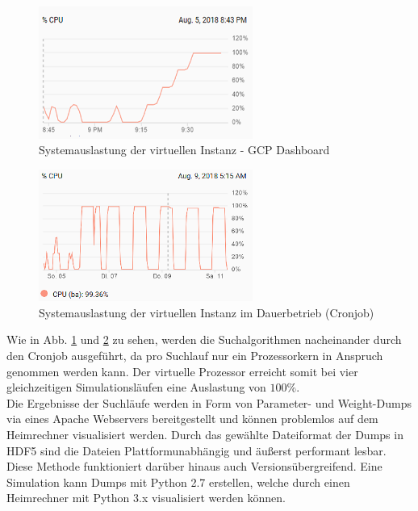 		\begin{minipage}[c]{0.5\textwidth}
			\begin{figure}[H] %
				\centering
				\includegraphics[width=7cm]{figures/chap_implement/GCP.png}
				\caption{Systemauslastung der virtuellen Instanz - GCP Dashboard}
				\label{fig:gcp_1}
			\end{figure}
		\end{minipage}
		\begin{minipage}[c]{0.5\textwidth}
			\begin{figure}[H] %
				\centering
				\includegraphics[width=7cm]{figures/chap_implement/GCP_2.png}
				\caption{Systemauslastung der virtuellen Instanz im Dauerbetrieb (Cronjob)}
				\label{fig:gcp_2}
			\end{figure}
		\end{minipage}\vspace{0.5cm}
		Wie in Abb. \ref{fig:gcp_1} und \ref{fig:gcp_2} zu sehen, werden die Suchalgorithmen nacheinander durch den Cronjob ausgeführt, da pro Suchlauf nur ein Prozessorkern in Anspruch genommen werden kann. Der virtuelle Prozessor erreicht somit bei vier gleichzeitigen Simulationsläufen eine Auslastung von $100\%$.\\
		Die Ergebnisse der Suchläufe werden in Form von Parameter- und Weight-Dumps via eines Apache Webservers bereitgestellt und können problemlos auf dem Heimrechner visualisiert werden. Durch das gewählte Dateiformat der Dumps in HDF5 \cite{hdf5} sind die Dateien Plattformunabhängig und äußerst performant lesbar. Diese Methode funktioniert darüber hinaus auch Versionsübergreifend. Eine Simulation kann Dumps mit Python 2.7 erstellen, welche durch einen Heimrechner mit Python 3.x visualisiert werden können.

